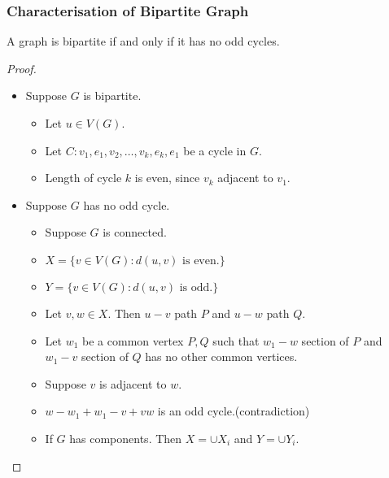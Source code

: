 \documentclass{beamer}
\begin{document}
\begin{frame}
\frametitle{Characterisation of Bipartite Graph}%
\begin{theorem}
	A graph is bipartite if and only if it has no odd cycles.
\end{theorem}
\begin{proof}
\begin{itemize}
	\item Suppose $G$ is bipartite.
	\begin{itemize}
		\item Let $u \in V(G)$.
		\item Let $C : v_1,e_1,v_2,\dots,v_k,e_k,e_1$ be a cycle in $G$.
		\item Length of cycle $k$ is even, since $v_k$ adjacent to $v_1$.
	\end{itemize}
	\item Suppose $G$ has no odd cycle.
	\begin{itemize}
		\item Suppose $G$ is connected.
		\item \alert{$X = \{ v \in V(G) : d(u,v) \text{ is even.}\}$}
		\item \alert{$Y = \{ v \in V(G) : d(u,v) \text{ is odd.} \}$}
		\item Let $v,w \in X$. Then $u-v$ path $P$ and $u-w$ path $Q$.
		\item Let $w_1$ be a common vertex $P,Q$ such that $w_1-w$ section of $P$ and $w_1-v$ section of $Q$ has no other common vertices.
		\item Suppose $v$ is adjacent to $w$.
		\item $w-w_1 + w_1-v + vw$ is an odd cycle.(contradiction)
		\item If $G$ has components. Then $X = \cup X_i$ and $Y = \cup Y_i$.
	\end{itemize}
\end{itemize}
\end{proof}
\end{frame}
\end{document}

